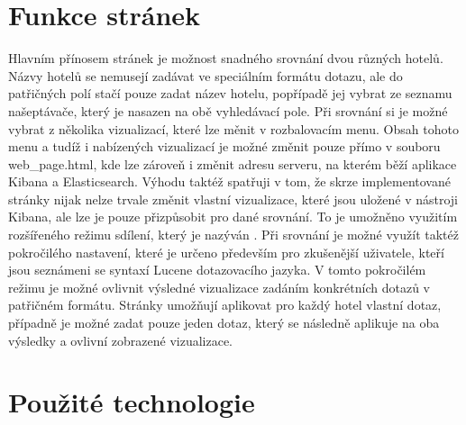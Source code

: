 \documentclass[czech,BP]{thesiskiv}
\begin{document}
\section{Funkce stránek}
Hlavním přínosem stránek je možnost snadného srovnání dvou různých hotelů. Názvy hotelů se nemusejí zadávat ve speciálním formátu dotazu, ale do patřičných polí stačí pouze zadat název hotelu, popřípadě jej vybrat ze  seznamu našeptávače, který je nasazen na obě vyhledávací pole. Při srovnání si je možné vybrat z několika vizualizací, které lze měnit v rozbalovacím menu. Obsah tohoto menu a tudíž i nabízených vizualizací je možné změnit pouze přímo v souboru web\_page.html, kde lze zároveň i změnit adresu serveru, na kterém běží aplikace Kibana a Elasticsearch. Výhodu taktéž spatřuji v tom, že skrze implementované stránky nijak nelze trvale změnit vlastní vizualizace, které jsou uložené v nástroji Kibana, ale lze je pouze přizpůsobit pro dané srovnání. To je umožněno využitím rozšířeného režimu sdílení, který je nazýván . Při srovnání je možné využít taktéž pokročilého nastavení, které je určeno především pro zkušenější uživatele, kteří jsou seznámeni se syntaxí Lucene dotazovacího jazyka. V tomto pokročilém režimu je možné ovlivnit výsledné vizualizace zadáním konkrétních dotazů v patřičném formátu. Stránky umožňují aplikovat pro každý hotel vlastní dotaz, případně je možné zadat pouze jeden dotaz, který se následně aplikuje na oba výsledky a ovlivní zobrazené vizualizace.
\section{Použité technologie}
\end{document}
